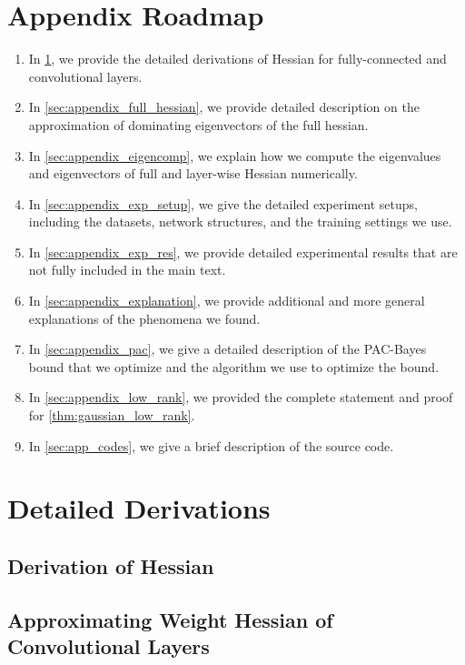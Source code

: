 \newpage


\section*{Appendix Roadmap}
\begin{enumerate}
    \item In \cref{sec:appendix_derivation_main}, we provide the detailed derivations of Hessian for fully-connected and convolutional layers.
    \item In \cref{sec:appendix_full_hessian}, we provide detailed description on the approximation of dominating eigenvectors of the full hessian.
    \item In \cref{sec:appendix_eigencomp}, we explain how we compute the eigenvalues and eigenvectors of full and layer-wise Hessian numerically.
    \item In \cref{sec:appendix_exp_setup}, we give the detailed experiment setups, including the datasets, network structures, and the training settings we use.
    \item In \cref{sec:appendix_exp_res}, we provide detailed experimental results that are not fully included in the main text.
    \item In \cref{sec:appendix_explanation}, we provide additional and more general explanations of the phenomena we found.
    \item In \cref{sec:appendix_pac}, we give a detailed description of the PAC-Bayes bound that we optimize and the algorithm we use to optimize the bound.
    \item In \cref{sec:appendix_low_rank}, we provided the complete statement and proof for \cref{thm:gaussian_low_rank}.
    \item In \cref{sec:app_codes}, we give a brief description of the source code.
\end{enumerate}

\section{Detailed Derivations}
\label{sec:appendix_derivation_main}
\subsection{Derivation of Hessian}

\subsection{Approximating Weight Hessian of Convolutional Layers}

\newpage

\newpage



\newpage
\newpage

\newpage

